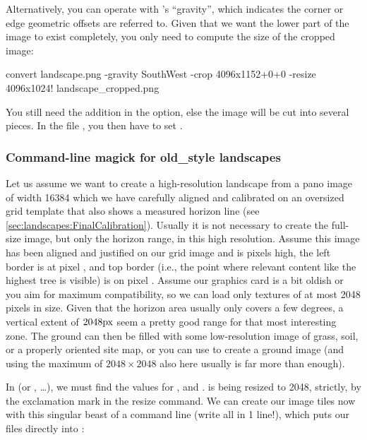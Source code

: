 Alternatively, you can operate with 's ``gravity'', which indicates
the corner or edge geometric offsets are referred to. Given that we
want the lower part of the image to exist completely, you only need to
compute the size of the cropped image:

\begin{commands}
convert landscape.png -gravity SouthWest -crop 4096x1152+0+0 
        -resize 4096x1024! landscape_cropped.png
\end{commands}

\noindent You still need the addition  in the  option,
else the image will be cut into several pieces.  In the file
, you then have to set .


\subsubsection{Command-line magick for old\_style landscapes}
\label{sec:landscapes:ImageMagic:oldstyle}


Let us assume we want to create a high-resolution landscape from a
pano image of width 16384 which we have carefully aligned and
calibrated on an oversized grid template that also shows a measured
horizon line (see \ref{sec:landscapes:FinalCalibration}). Usually it
is not necessary to create the full-size image, but only the horizon
range, in this high resolution. Assume this image has been aligned and
justified on our grid image and is  pixels high, the left
border is at pixel , and top border (i.e., the point
where relevant content like the highest tree is visible) is on pixel
. Assume our graphics card is a bit oldish or you aim for
maximum compatibility, so we can load only textures of at most 2048
pixels in size. Given that the horizon area usually only covers a few
degrees, a vertical extent of $2048\px$ seem a pretty good range for
that most interesting zone. The ground can then be filled with some
low-resolution image of grass, soil, or a properly oriented site map,
or you can use  to create a ground image (and using the
maximum of $2048\times2048$ also here usually is far more than
enough).

In  (or , \ldots), we must find the values for
,  and .  is being
resized to 2048, strictly, by the exclamation mark in the resize
command.  We can create our image tiles now with this singular beast
of a command line (write all in 1 line!), which puts our files directly into
:

